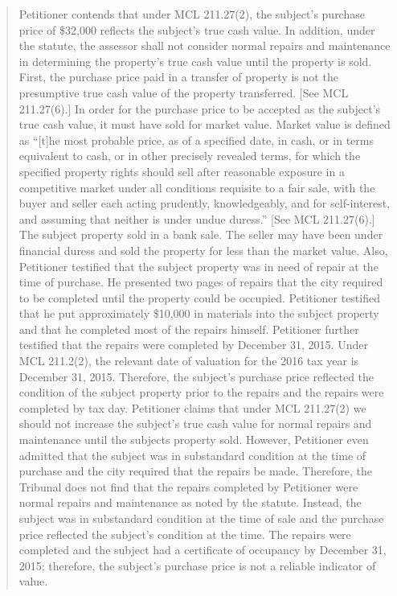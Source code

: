 \documentclass[12pt,\documentclassflag]{michiganCourtOfAppealsBrief}
\begin{document}
\begin{quote} Petitioner contends that under MCL 211.27(2), the subject’s purchase price of \$32,000 reflects the subject’s true cash value. In addition, under the statute, the assessor shall not consider normal repairs and maintenance in determining the property’s true cash value until the property is sold. First, the purchase price paid in a transfer of property is not the presumptive true cash value of the property transferred. [See MCL 211.27(6).] In order for the purchase price to be accepted as the subject’s true cash value, it must have sold for market value. Market value is defined as ``[t]he most probable price, as of a specified date, in cash, or in terms equivalent to cash, or in other precisely revealed terms, for which the specified property rights should sell after reasonable exposure in a competitive market under all conditions requisite to a fair sale, with the buyer and seller each acting prudently, knowledgeably, and for self-interest, and assuming that neither is under undue duress.'' [See MCL 211.27(6).] The subject property sold in a bank sale. The seller may have been under financial duress and sold the property for less than the market value. Also, Petitioner testified that the subject property was in need of repair at the time of purchase. He presented two pages of repairs that the city required to be completed until the property could be occupied. Petitioner testified that he put approximately \$10,000 in materials into the subject property and that he completed most of the repairs himself. Petitioner further testified that the repairs were completed by December 31, 2015. Under MCL 211.2(2), the relevant date of valuation for the 2016 tax year is December 31, 2015. Therefore, the subject’s purchase price reflected the condition of the subject property prior to the repairs and the repairs were completed by tax day. Petitioner claims that under MCL 211.27(2) we should not increase the subject’s true cash value for normal repairs and maintenance until the subjects property sold. However, Petitioner even admitted that the subject was in substandard condition at the time of purchase and the city required that the repairs be made. Therefore, the Tribunal does not find that the repairs completed by Petitioner were normal repairs and maintenance as noted by the statute. Instead, the subject was in substandard condition at the time of sale and the purchase price reflected the subject’s condition at the time. The repairs were completed and the subject had a certificate of occupancy by December 31, 2015; therefore, the subject’s purchase price is not a reliable indicator of value. 
\end{quote}
\end{document}
